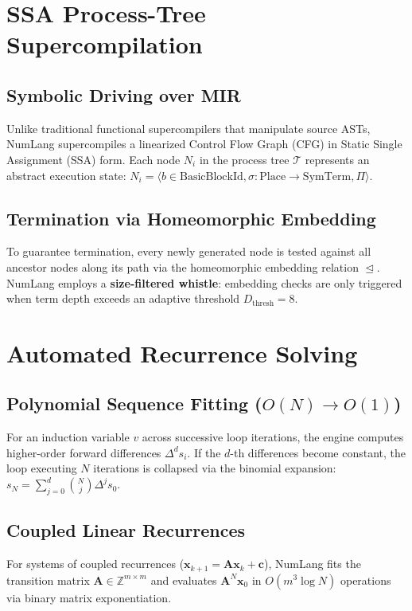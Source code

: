 \documentclass[10pt,twocolumn]{article}
\begin{document}
\section{SSA Process-Tree Supercompilation}
\subsection{Symbolic Driving over MIR}
Unlike traditional functional supercompilers that manipulate source ASTs, NumLang supercompiles a linearized Control Flow Graph (CFG) in Static Single Assignment (SSA) form. Each node $N_i$ in the process tree $\mathcal{T}$ represents an abstract execution state:
$N_i = \langle b \in \text{BasicBlockId}, \sigma: \text{Place} \to \text{SymTerm}, \Pi \rangle$.

\subsection{Termination via Homeomorphic Embedding}
To guarantee termination, every newly generated node is tested against all ancestor nodes along its path via the homeomorphic embedding relation $\trianglelefteq$. NumLang employs a \textbf{size-filtered whistle}: embedding checks are only triggered when term depth exceeds an adaptive threshold $D_{\text{thresh}} = 8$.

\section{Automated Recurrence Solving}
\subsection{Polynomial Sequence Fitting ($O(N) \to O(1)$)}
For an induction variable $v$ across successive loop iterations, the engine computes higher-order forward differences $\Delta^d s_i$. If the $d$-th differences become constant, the loop executing $N$ iterations is collapsed via the binomial expansion:
$s_N = \sum_{j=0}^d \binom{N}{j} \Delta^j s_0$.

\subsection{Coupled Linear Recurrences}
For systems of coupled recurrences ($\mathbf{x}_{k+1} = \mathbf{A} \mathbf{x}_k + \mathbf{c}$), NumLang fits the transition matrix $\mathbf{A} \in \mathbb{Z}^{m \times m}$ and evaluates $\mathbf{A}^N \mathbf{x}_0$ in $O(m^3 \log N)$ operations via binary matrix exponentiation.
\end{document}
